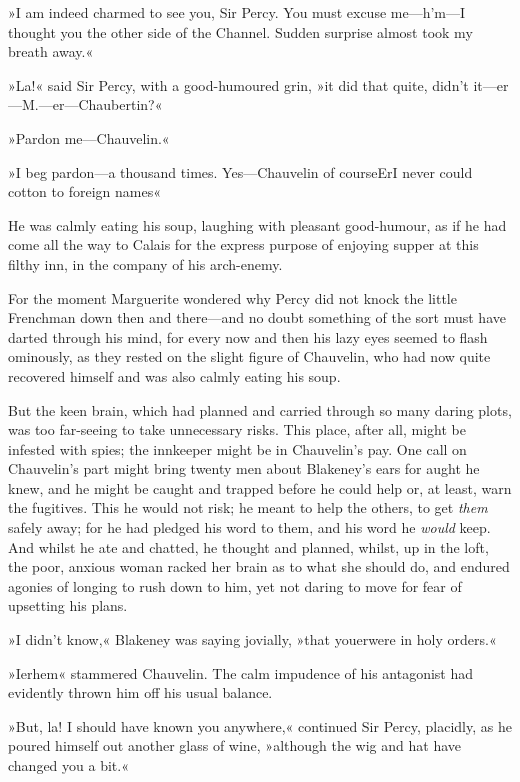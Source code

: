 »I am indeed charmed to see you, Sir Percy. You must excuse me—h'm—I thought you the other side of the Channel. Sudden surprise almost took my breath away.«

»La!« said Sir Percy, with a good-humoured grin, »it did that quite, didn't it—er—M.—er—Chaubertin?«

»Pardon me—Chauvelin.«

»I beg pardon—a thousand times. Yes—Chauvelin of course\textellipsis \allowbreak  Er\textellipsis \allowbreak  I never could cotton to foreign names\textellipsis«

He was calmly eating his soup, laughing with pleasant good-humour, as if he had come all the way to Calais for the express purpose of enjoying supper at this filthy inn, in the company of his arch-enemy.

For the moment Marguerite wondered why Percy did not knock the little Frenchman down then and there—and no doubt something of the sort must have darted through his mind, for every now and then his lazy eyes seemed to flash ominously, as they rested on the slight figure of Chauvelin, who had now quite recovered himself and was also calmly eating his soup.

But the keen brain, which had planned and carried through so many daring plots, was too far-seeing to take unnecessary risks. This place, after all, might be infested with spies; the innkeeper might be in Chauvelin's pay. One call on Chauvelin's part might bring twenty men about Blakeney's ears for aught he knew, and he might be caught and trapped before he could help or, at least, warn the fugitives. This he would not risk; he meant to help the others, to get \textit{them} safely away; for he had pledged his word to them, and his word he \textit{would} keep. And whilst he ate and chatted, he thought and planned, whilst, up in the loft, the poor, anxious woman racked her brain as to what she should do, and endured agonies of longing to rush down to him, yet not daring to move for fear of upsetting his plans.

»I didn't know,« Blakeney was saying jovially, »that you\textellipsis \allowbreak  er\textellipsis \allowbreak  were in holy orders.«

»I\textellipsis \allowbreak  er\textellipsis \allowbreak  hem\textellipsis« stammered Chauvelin. The calm impudence of his antagonist had evidently thrown him off his usual balance.

»But, la! I should have known you anywhere,« continued Sir Percy, placidly, as he poured himself out another glass of wine, »although the wig and hat have changed you a bit.«

